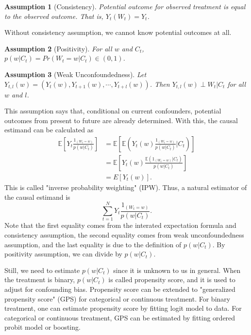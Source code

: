 \documentclass[12pt]{article}
\newtheorem{asm}{Assumption}
\begin{document}
\begin{asm}[Consistency]\hfill

	Potential outcome for observed treatment is equal to the observed outcome.
	That is, $Y_t(W_t) = Y_t$.
\end{asm}
Without consistency assumption, we cannot know potential outcomes at all.

\begin{asm}[Positivity]\hfill

	For all $w$ and $C_t$, $p(w\lvert C_t) = Pr\left ( W_t = w \lvert C_t\right ) \in (0, 1)$.
\end{asm}


\begin{asm}[Weak Unconfoundedness] \hfill

	Let $Y_{t,l}(w) = \left( Y_t(w), Y_{t+1}(w), \cdots, Y_{t+l}(w) \right)$.
	Then $Y_{t,l}(w) \perp W_t \lvert C_t$ for all $w$ and $l$.
\end{asm}
This assumption says that, conditional on current confounders, potential outcomes from present to future are already determined.
With this, the causal estimand can be calculated as
\[
	\begin{split}
		\mathbb{E}\left[ Y_t\frac{1_{(W_t = w)}}{p(w\lvert C_t)} \right]
		& = \mathbb{E}\left[ \mathbb{E}\left( Y_t(w) \frac{1_{(W_t = w)}}{p(w\lvert C_t)} \lvert C_t\right)\right]\\
		& = \mathbb{E}\left[ Y_t(w)\frac{\mathbb{E}\left( 1_{(W_t = w)}\lvert C_t \right)}{p(w\lvert C_t)} \right]\\
		& = E\left[ Y_t(w) \right].
	\end{split}
\]
This is called "inverse probability weighting" (IPW).
Thus, a natural estimator of the causal estimand is
\[
	\sum_{t = 1}^N Y_t \frac{1_{(W_t = w)}}{p(w\lvert C_t)}.	
\]
Note that the first equality comes from the interated expectation formula and consistency assumption,
the second equality comes from weak unconfoundedness assumption,
and the last equality is due to the definition of $p(w\lvert C_t)$.
By positivity assumption, we can divide by $p(w\lvert C_t)$.

Still, we need to estimate $p(w\lvert C_t)$ since it is unknown to us in general.
When the treatment is binary, $p(w\lvert C_t)$ is called propensity score,
and it is used to adjust for confounding bias.\cite{rosenbaum1983}
Propensity score can be extended to 
"generalized propensity score" (GPS) for categorical or continuous treatment.\cite{imbens2000}
For binary treatment, one can estimate propensity score by fitting logit model to data.
For categorical or continuous treatment, GPS can be estimated by fitting ordered probit model or boosting.
\end{document}
